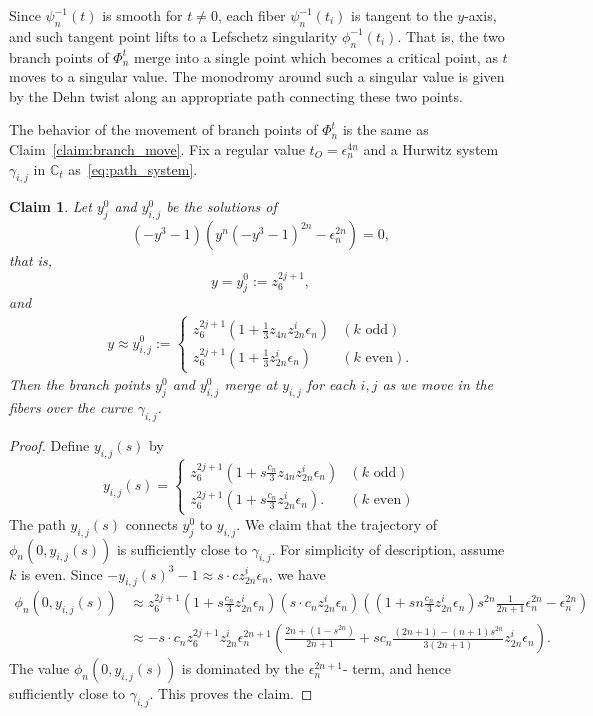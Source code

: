 \documentclass[10pt,a4paper,reqno]{amsart}
\newtheorem{claim}[thm]{Claim}
\theoremstyle{definition}
\numberwithin{equation}{section}
\numberwithin{figure}{section}
\newcommand{\C}{\mathbb{C}}
\newcommand{\ep}{\epsilon}
\begin{document}
Since $\psi_n^{-1}(t)$ is smooth for $t\neq 0$, each fiber $\psi_n^{-1}(t_i)$ is tangent to the $y$-axis, and such tangent point lifts to a Lefschetz singularity $\phi_n^{-1}(t_i)$. 
That is, the two branch points of $\Phi_n^t$ merge into a single point which becomes a critical point, 
as $t$ moves to a singular value.
The monodromy around such a singular value is given by the Dehn twist along an appropriate path connecting these two points.

The behavior of the movement of branch points of $\Phi_n^t$ is the same as Claim~\ref{claim:branch_move}.
Fix a regular value ${t_O}={\ep_n^{4n}}$ and a Hurwitz system $\gamma_{i,j}$ in $\C_t$ as~\eqref{eq:path_system}.

\begin{claim} \label{claim:overlap_2}
Let $y_j^0$ and $y_{i,j}^0$ be the solutions of \[(-y^3-1)(y^n(-y^3-1)^{2n}-{\ep_n^{2n}})=0,\]
that is, \[y=y_j^0:=z_6^{2j+1},\] and
\begin{align}\label{eq:refpoints}
y \approx y_{i,j}^0:= \begin{cases} z_6^{2j+1}(1+\frac{1}{3}z_{4n}z_{2n}^i {\ep_n}) & (k \text{ odd}) \\
 z_6^{2j+1}(1+\frac{1}{3}z_{2n}^i {\ep_n})& (k \text{ even}). \end{cases}
\end{align}
Then the branch points $y_j^0$ and $y_{i,j}^0$ merge at $y_{i,j}$ for each $i,j$ as we move in the fibers over the curve ${\gamma}_{i,j}$.
\end{claim}

\begin{proof}
Define $y_{i,j}(s)$ by
\[ y_{i,j}(s)= \begin{cases} z_6^{2j+1}(1+s \frac{c_n}{3} z_{4n}z_{2n}^i {\ep_n}) & (k \text{ odd}) \\z_6^{2j+1}(1+s \frac{c_n}{3}z_{2n}^i {\ep_n}). & (k \text{ even}) \end{cases}\]
The path $y_{i,j}(s)$ connects $y_j^0$ to $y_{i,j}$.
We claim that the trajectory of $\phi_n(0,y_{i,j}(s))$ is sufficiently close to $\gamma_{i,j}$.
For simplicity of description, assume $k$ is even.
Since $-y_{i,j}(s)^3-1 \approx s \cdot cz_{2n}^i {\ep_n}$, we have
\begin{align*}
\phi_n(0,y_{i,j}(s)) &\approx z_{6}^{2j+1}(1+s \frac{c_n}{3}z_{2n}^i {\ep_n}) (s \cdot c_n z_{2n}^i {\ep_n}) \left( (1+sn \frac{c_n}{3}z_{2n}^i {\ep_n})s^{2n} \frac{1}{2n+1}{\ep_n^{2n}}-{\ep_n^{2n}}\right) \\
&\approx  -s \cdot c_n  z_{6}^{2j+1} z_{2n}^i{\ep_n^{2n+1}} \left( \frac{2n+(1-s^{2n})}{2n+1}+sc_n \frac{(2n+1)-(n+1)s^{2n}}{3(2n+1)} z_{2n}^i {\ep_n} \right).
\end{align*}
The value $\phi_n(0,y_{i,j}(s))$ is dominated by the ${\ep_n^{2n+1}}$- term, and hence sufficiently close to $\gamma_{i,j}$. 
This proves the claim.
\end{proof}
\end{document}
